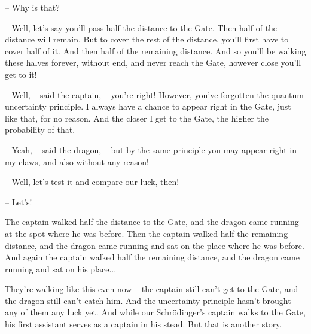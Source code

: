 \documentclass[ebook,oneside,final,openright]{memoir}
\begin{document}
– Why is that?\par
– Well, let’s say you’ll pass half the distance to the Gate. Then half of the distance will remain. But to cover the rest of the distance, you’ll first have to cover half of it. And then half of the remaining distance. And so you’ll be walking these halves forever, without end, and never reach the Gate, however close you’ll get to it!\par
– Well, – said the captain, – you’re right! However, you’ve forgotten the quantum uncertainty principle. I always have a chance to appear right in the Gate, just like that, for no reason. And the closer I get to the Gate, the higher the probability of that.\par
– Yeah, – said the dragon, – but by the same principle you may appear right in my claws, and also without any reason!\par
– Well, let’s test it and compare our luck, then!\par
– Let’s!\par
\par
The captain walked half the distance to the Gate, and the dragon came running at the spot where he was before. Then the captain walked half the remaining distance, and the dragon came running and sat on the place where he was before. And again the captain walked half the remaining distance, and the dragon came running and sat on his place...\par
\par
They’re walking like this even now – the captain still can’t get to the Gate, and the dragon still can’t catch him. And the uncertainty principle hasn’t brought any of them any luck yet. And while our Schrödinger’s captain walks to the Gate, his first assistant serves as a captain in his stead. But that is another story.
\end{document}
